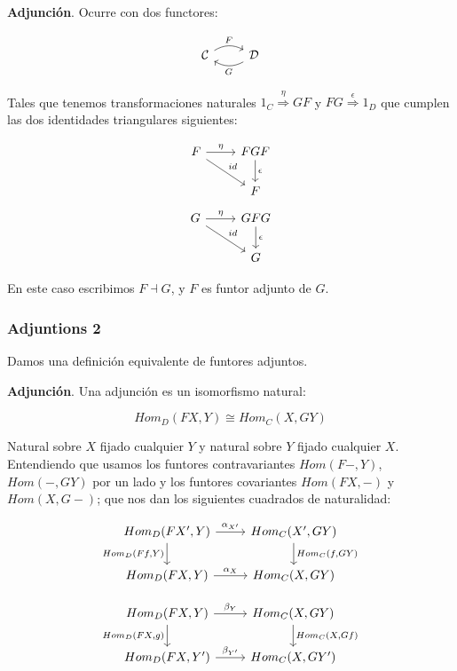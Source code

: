 \documentclass[11pt]{article}
\begin{document}
\begin{definition}
\textbf{Adjunción}. Ocurre con dos functores:

\[ \begin{tikzcd}
{\cal C} \arrow[bend left]{r}{F} & {\cal D} \arrow[bend left]{l}{G}
\end{tikzcd}
\]

Tales que tenemos transformaciones naturales $1_C \overset{\eta}\Longrightarrow GF$ y 
$FG \overset{\epsilon}\Longrightarrow 1_D$ que cumplen las dos identidades triangulares siguientes:

\[ \begin{tikzcd}
F \arrow{r}{\eta} \arrow{dr}{id} & FGF \arrow{d}{\epsilon} \\
 & F
\end{tikzcd}   
\]     \[ \begin{tikzcd}
G \arrow{r}{\eta} \arrow{dr}{id} & GFG \arrow{d}{\epsilon} \\
 & G
\end{tikzcd}
\]
\end{definition}

En este caso escribimos $F \dashv G$, y $F$ es funtor adjunto de $G$.

\subsubsection*{Adjuntions 2}
\label{sec-2-1-2}
Damos una definición equivalente de funtores adjuntos.

\begin{definition}
\textbf{Adjunción}. Una adjunción es un isomorfismo natural:

\[Hom_D(FX,Y) \cong Hom_C(X,GY)\]

Natural sobre $X$ fijado cualquier $Y$ y natural sobre $Y$ fijado 
cualquier $X$. Entendiendo que usamos los funtores contravariantes $Hom(F-,Y)$,
$Hom(-,GY)$ por un lado y los funtores covariantes $Hom(FX,-)$ y $Hom(X,G-)$;
que nos dan los siguientes cuadrados de naturalidad:

\[ \begin{tikzcd}
Hom_D(FX',Y) \arrow{d}[swap]{Hom_D(Ff,Y)} \arrow{r}{\alpha_{X'}} & Hom_C(X',GY) \arrow{d}{Hom_C(f,GY)}\\
Hom_D(FX, Y) \arrow{r}{\alpha_{X}}& Hom_C(X,GY)
\end{tikzcd}
\] 

\[ \begin{tikzcd}
Hom_D(FX,Y) \arrow{d}[swap]{Hom_D(FX,g)} \arrow{r}{\beta_{Y}} & Hom_C(X,GY) \arrow{d}{Hom_C(X,Gf)}\\
Hom_D(FX,Y') \arrow{r}{\beta_{Y'}}& Hom_C(X,GY')
\end{tikzcd}
\] 
\end{definition}
\end{document}
